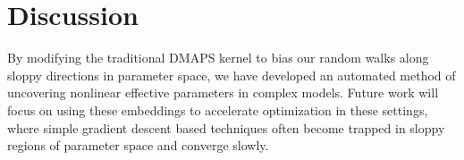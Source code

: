 \section{Discussion}

By modifying the traditional DMAPS kernel to bias our random walks
along sloppy directions in parameter space, we have developed an
automated method of uncovering nonlinear effective parameters in
complex models. Future work will focus on using these embeddings to
accelerate optimization in these settings, where simple gradient
descent based techniques often become trapped in sloppy regions of
parameter space and converge slowly.


